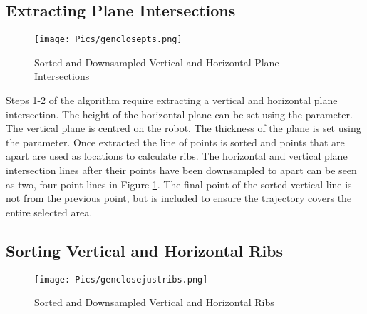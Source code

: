 \subsection{Extracting Plane Intersections}


\begin{figure}[H]
    \centering
    \texttt{[image: Pics/genclosepts.png]}
    \caption{Sorted and Downsampled Vertical and Horizontal Plane Intersections}
    \label{fig:sortedintersections}
\end{figure}

Steps 1-2 of the algorithm require extracting a vertical and horizontal plane intersection. The height of the horizontal plane can be set using the  parameter. The vertical plane is centred on the robot. The thickness of the plane is set using the  parameter. Once extracted the line of points is sorted and points that are  apart are used as locations to calculate ribs. The horizontal and vertical plane intersection lines after their points have been downsampled to  apart can be seen as two, four-point lines in Figure \ref{fig:sortedintersections}. The final point of the sorted vertical line is not  from the previous point, but is included to ensure the trajectory covers the entire selected area.\\

\subsection{Sorting Vertical and Horizontal Ribs}
\label{sec:sortlines}
\begin{figure}[H]
    \centering
    \texttt{[image: Pics/genclosejustribs.png]}
    \caption{Sorted and Downsampled Vertical and Horizontal Ribs}
    \label{fig:ribs}
\end{figure}


